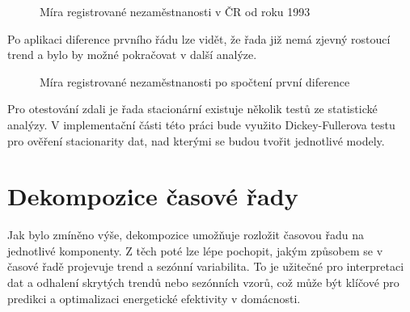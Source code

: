 \documentclass[FM,BP,fonts]{tulthesis}
\begin{document}
\begin{figure}[htbp]
	\centering
	\caption{Míra registrované nezaměstnanosti v ČR od roku 1993 }
	\label{fig:nezamestnanost}
\end{figure}

Po aplikaci diference prvního řádu lze vidět, že řada již nemá zjevný rostoucí trend a bylo by možné pokračovat v další analýze.

\begin{figure}[htbp]
	\centering
	\caption{Míra registrované nezaměstnanosti po spočtení první diference }
	\label{fig:nezamestnanost_diff}
\end{figure}

Pro otestování zdali je řada stacionární existuje několik testů ze statistické analýzy. V implementační části této práci bude využito Dickey-Fullerova testu pro ověření stacionarity dat, nad kterými se budou tvořit jednotlivé modely. 


\section{Dekompozice časové řady}
Jak bylo zmíněno výše, dekompozice umožňuje rozložit časovou řadu na jednotlivé komponenty. Z těch poté lze lépe pochopit, jakým způsobem se v časové řadě projevuje trend a sezónní variabilita. To je užitečné pro interpretaci dat a odhalení skrytých trendů nebo sezónních vzorů, což může být klíčové pro predikci a optimalizaci energetické efektivity v domácnosti.
\end{document}
